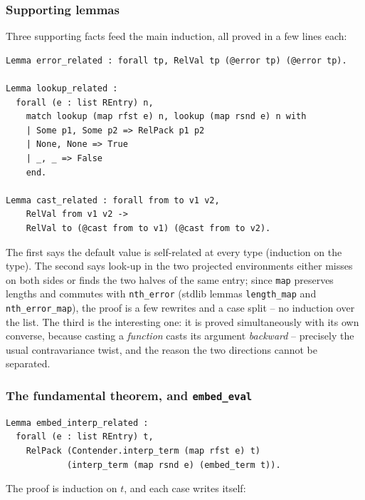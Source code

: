 \documentclass[11pt,a4paper]{article}
\theoremstyle{plain}
\theoremstyle{definition}
\theoremstyle{remark}
\begin{document}
\subsubsection{Supporting lemmas}

Three supporting facts feed the main induction, all proved in a few
lines each:

\begin{lstlisting}
Lemma error_related : forall tp, RelVal tp (@error tp) (@error tp).

Lemma lookup_related :
  forall (e : list REntry) n,
    match lookup (map rfst e) n, lookup (map rsnd e) n with
    | Some p1, Some p2 => RelPack p1 p2
    | None, None => True
    | _, _ => False
    end.

Lemma cast_related : forall from to v1 v2,
    RelVal from v1 v2 ->
    RelVal to (@cast from to v1) (@cast from to v2).
\end{lstlisting}

The first says the default value is self-related at every type
(induction on the type).  The second says look-up in the two projected
environments either misses on both sides or finds the two halves of
the same entry; since \texttt{map} preserves lengths and commutes with
\texttt{nth\_error} (stdlib lemmas \texttt{length\_map} and
\texttt{nth\_error\_map}), the proof is a few rewrites and a case
split -- no induction over the list.  The third is the interesting
one: it is proved simultaneously with its own converse, because
casting a \emph{function} casts its argument \emph{backward} --
precisely the usual contravariance twist, and the reason the two
directions cannot be separated.

\subsubsection{The fundamental theorem, and \texttt{embed\_eval}}

\begin{lstlisting}
Lemma embed_interp_related :
  forall (e : list REntry) t,
    RelPack (Contender.interp_term (map rfst e) t)
            (interp_term (map rsnd e) (embed_term t)).
\end{lstlisting}

The proof is induction on $t$, and each case writes itself:
\end{document}

